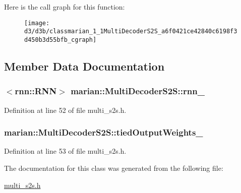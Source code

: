 Here is the call graph for this function\+:
\nopagebreak
\begin{figure}[H]
\begin{center}
\leavevmode
\texttt{[image: d3/d3b/classmarian\_1\_1MultiDecoderS2S\_a6f0421ce42840c6198f3d450b3d55bfb\_cgraph]}
\end{center}
\end{figure}




\subsection{Member Data Documentation}
\subsubsection[{\texorpdfstring{rnn\+\_\+}{rnn_}}]{$<$rnn\+::\+R\+NN$>$ marian\+::\+Multi\+Decoder\+S2\+S\+::rnn\+\_\+\hspace{0.3cm}{\ttfamily [private]}}\hypertarget{classmarian_1_1MultiDecoderS2S_aa17bae4e5a1cb917737c8d23511a5701}{}\label{classmarian_1_1MultiDecoderS2S_aa17bae4e5a1cb917737c8d23511a5701}


Definition at line 52 of file multi\+\_\+s2s.\+h.

\subsubsection[{\texorpdfstring{tied\+Output\+Weights\+\_\+}{tiedOutputWeights_}}]{ marian\+::\+Multi\+Decoder\+S2\+S\+::tied\+Output\+Weights\+\_\+\hspace{0.3cm}{\ttfamily [private]}}\hypertarget{classmarian_1_1MultiDecoderS2S_afbfb909daccdfdbcc46c0240221fbaa9}{}\label{classmarian_1_1MultiDecoderS2S_afbfb909daccdfdbcc46c0240221fbaa9}


Definition at line 53 of file multi\+\_\+s2s.\+h.



The documentation for this class was generated from the following file\+:\begin{DoxyCompactItemize}
\item 
\hyperlink{multi__s2s_8h}{multi\+\_\+s2s.\+h}\end{DoxyCompactItemize}
